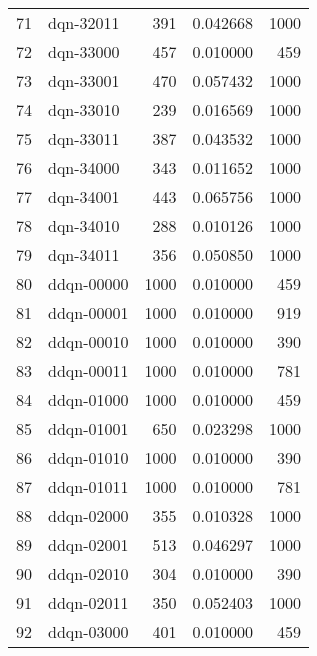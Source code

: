 \documentclass{article}
\begin{document}
\begin{table}
\begin{tabular}{llrrr}
71  &            dqn-32011 &             391 &   0.042668 &              1000 \\
72  &            dqn-33000 &             457 &   0.010000 &               459 \\
73  &            dqn-33001 &             470 &   0.057432 &              1000 \\
74  &            dqn-33010 &             239 &   0.016569 &              1000 \\
75  &            dqn-33011 &             387 &   0.043532 &              1000 \\
76  &            dqn-34000 &             343 &   0.011652 &              1000 \\
77  &            dqn-34001 &             443 &   0.065756 &              1000 \\
78  &            dqn-34010 &             288 &   0.010126 &              1000 \\
79  &            dqn-34011 &             356 &   0.050850 &              1000 \\
80  &           ddqn-00000 &            1000 &   0.010000 &               459 \\
81  &           ddqn-00001 &            1000 &   0.010000 &               919 \\
82  &           ddqn-00010 &            1000 &   0.010000 &               390 \\
83  &           ddqn-00011 &            1000 &   0.010000 &               781 \\
84  &           ddqn-01000 &            1000 &   0.010000 &               459 \\
85  &           ddqn-01001 &             650 &   0.023298 &              1000 \\
86  &           ddqn-01010 &            1000 &   0.010000 &               390 \\
87  &           ddqn-01011 &            1000 &   0.010000 &               781 \\
88  &           ddqn-02000 &             355 &   0.010328 &              1000 \\
89  &           ddqn-02001 &             513 &   0.046297 &              1000 \\
90  &           ddqn-02010 &             304 &   0.010000 &               390 \\
91  &           ddqn-02011 &             350 &   0.052403 &              1000 \\
92  &           ddqn-03000 &             401 &   0.010000 &               459 \\

\end{tabular}
\end{table}
\end{document}

